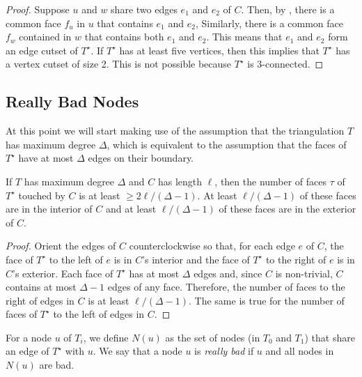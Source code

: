 \documentclass{patmorin}
\newcommand{\dual}[1]{{#1}^\star}
\begin{document}
\begin{proof}
   Suppose $u$ and $w$ share two edges $e_1$ and $e_2$ of $C$.  Then, by
   , there is a common face $f_u$ in $u$ that contains
   $e_1$ and $e_2$, Similarly, there is a common face $f_w$ contained
   in $w$ that contains both $e_1$ and $e_2$.  This means that $e_1$ and
   $e_2$ form an edge cutset of $\dual{T}$.  If $\dual{T}$ has at least
   five vertices, then this implies that $\dual{T}$ has a vertex cutset
   of size 2.  This is not possible because $\dual{T}$ is 3-connected.
\end{proof}



\subsection{Really Bad Nodes}


At this point we will start making use of the assumption that the
triangulation $T$ has maximum degree $\Delta$, which is equivalent to
the assumption that the faces of $\dual{T}$ have at most $\Delta$ edges
on their boundary.

\begin{obs}
  If $T$ has maximum degree $\Delta$ and $C$ has length $\ell$, then
  the number of faces $\tau$ of $\dual{T}$ touched by $C$ is at least $\ge
  2\ell/(\Delta-1)$.  At least $\ell/(\Delta-1)$ of these faces are in
  the interior of $C$ and at least $\ell/(\Delta-1)$ of these faces are
  in the exterior of $C$.
\end{obs}

\begin{proof}
  Orient the edges of $C$ counterclockwise so that, for each edge
  $e$ of $C$, the face of $\dual{T}$ to the left of $e$ is in $C$'s
  interior and the face of $\dual{T}$ to the right of $e$ is in $C$'s
  exterior.  Each face of $\dual{T}$ has at most $\Delta$ edges and,
  since $C$ is non-trivial, $C$ contains at most $\Delta-1$ edges of any
  face. Therefore, the number of faces to the right of edges in $C$ is
  at least $\ell/(\Delta-1)$. The same is true for the number of faces
  of $\dual{T}$ to the left of edges in $C$.
\end{proof}

For a node $u$ of $T_i$, we define $N(u)$ as the set of nodes (in $T_0$
and $T_1$) that share an edge of $\dual{T}$ with $u$.  We say that a
node $u$ is \emph{really bad} if $u$ and all nodes in $N(u)$ are bad.
\end{document}
